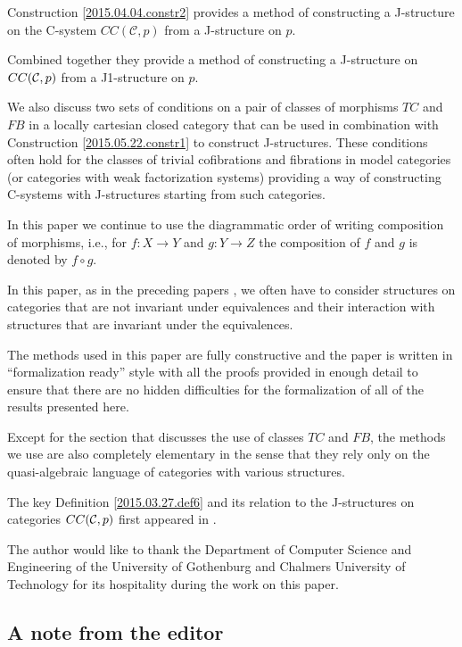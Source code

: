 \documentclass[12pt]{article}
\numberwithin{equation}{section}
\newcommand{\sr}{\rightarrow}
\newcommand{\toCC}{CC} %
\newcommand{\C}{{\mathcal C}}  %
\begin{document}
Construction \ref{2015.04.04.constr2} provides a method of constructing a
J-structure on the C-system $\toCC({\C},p)$ from a J-structure on $p$.

Combined together they provide a method of constructing a J-structure on
$\toCC({\cal C},p)$ from a J1-structure on $p$.

We also discuss two sets of conditions on a pair of classes of morphisms $TC$
and $FB$ in a locally cartesian closed category that can be used in combination
with Construction \ref{2015.05.22.constr1} to construct J-structures. These
conditions often hold for the classes of trivial cofibrations and fibrations in
model categories (or categories with weak factorization systems) providing a
way of constructing C-systems with J-structures starting from such categories.

In this paper we continue to use the diagrammatic order of writing composition
of morphisms, i.e., for $f:X\sr Y$ and $g:Y\sr Z$ the composition of $f$ and
$g$ is denoted by $f\circ g$.

In this paper, as in the preceding papers \cite{Cfromauniverse,fromunivwithPi},
we often have to consider structures on categories that
are not invariant under equivalences and their interaction with structures that
are invariant under the equivalences.

The methods used in this paper are fully constructive and the paper is written
in ``formalization ready'' style with all the proofs provided in enough detail
to ensure that there are no hidden difficulties for the formalization of all of
the results presented here.

Except for the section that discusses the use of classes $TC$ and $FB$, the
methods we use are also completely elementary in the sense that they rely only
on the quasi-algebraic language of categories with various structures.

The key Definition \ref{2015.03.27.def6} and its relation to the J-structures
on categories $\toCC({\cal C},p)$ first appeared in \cite{CMUtalk}.

The author would like to thank the Department of Computer Science and
Engineering of the University of Gothenburg and Chalmers University of
Technology for its hospitality during the work on this paper.


\subsection{A note from the editor}
\end{document}
